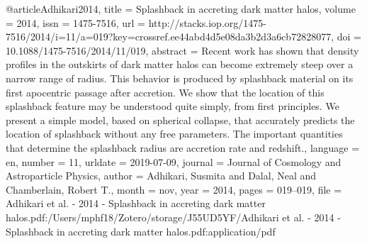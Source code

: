 {@article{Adhikari2014,
	title = {Splashback in accreting dark matter halos},
	volume = {2014},
	issn = {1475-7516},
	url = {http://stacks.iop.org/1475-7516/2014/i=11/a=019?key=crossref.ee44abd4d5e08da3b2d3a6cb72828077},
	doi = {10.1088/1475-7516/2014/11/019},
	abstract = {Recent work has shown that density proﬁles in the outskirts of dark matter halos can become extremely steep over a narrow range of radius. This behavior is produced by splashback material on its ﬁrst apocentric passage after accretion. We show that the location of this splashback feature may be understood quite simply, from ﬁrst principles. We present a simple model, based on spherical collapse, that accurately predicts the location of splashback without any free parameters. The important quantities that determine the splashback radius are accretion rate and redshift.},
	language = {en},
	number = {11},
	urldate = {2019-07-09},
	journal = {Journal of Cosmology and Astroparticle Physics},
	author = {Adhikari, Susmita and Dalal, Neal and Chamberlain, Robert T.},
	month = nov,
	year = {2014},
	pages = {019--019},
	file = {Adhikari et al. - 2014 - Splashback in accreting dark matter halos.pdf:/Users/mphf18/Zotero/storage/J55UD5YF/Adhikari et al. - 2014 - Splashback in accreting dark matter halos.pdf:application/pdf}
}


}
